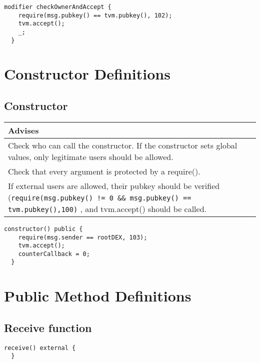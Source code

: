 \begin{lstlisting}[firstnumber=79]
  modifier checkOwnerAndAccept {
    require(msg.pubkey() == tvm.pubkey(), 102);
    tvm.accept();
    _;
  }
\end{lstlisting}

\section{Constructor Definitions}


\subsection{Constructor}

\ifsoldraft
\noindent\begin{tabular}{|p{12cm}|}\hline
\rowcolor{green}Advises
\\\hline
Check who can call the constructor. If the constructor sets global values, only legitimate users should be allowed.
\\\hline
Check that every argument is protected by a require().
\\\hline
If external users are allowed, their pubkey should be verified (\verb+require(msg.pubkey() != 0 && msg.pubkey() == tvm.pubkey(),100)+ , and tvm.accept() should be called.
\\\hline\end{tabular}
\fi
\vspace{2cm}

\begin{lstlisting}[firstnumber=85]
  constructor() public {
    require(msg.sender == rootDEX, 103);
    tvm.accept();
    counterCallback = 0;
  }
\end{lstlisting}

\section{Public Method Definitions}


\subsection{Receive function}

\vspace{2cm}

\begin{lstlisting}[firstnumber=413]
  receive() external {
  }
\end{lstlisting}

